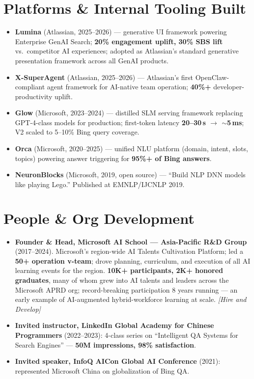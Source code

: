 \documentclass[10.5pt,letterpaper]{article}
\newcommand{\lp}[1]{\textcolor{blue!55!black}{\small\textit{[#1]}}}
\begin{document}
\section*{Platforms \& Internal Tooling Built}
\begin{itemize}
  \item \textbf{Lumina} (Atlassian, 2025--2026) --- generative UI framework powering Enterprise GenAI Search; \textbf{20\% engagement uplift, 30\% SBS lift} vs.\ competitor AI experiences; adopted as Atlassian's standard generative presentation framework across all GenAI products.
  \item \textbf{X-SuperAgent} (Atlassian, 2025--2026) --- Atlassian's first OpenClaw-compliant agent framework for AI-native team operation; \textbf{40\%+} developer-productivity uplift.
  \item \textbf{Glow} (Microsoft, 2023--2024) --- distilled SLM serving framework replacing GPT-4-class models for production; first-token latency \textbf{20--30\,s $\to$ $\sim$5\,ms}; V2 scaled to 5--10\% Bing query coverage.
  \item \textbf{Orca} (Microsoft, 2020--2025) --- unified NLU platform (domain, intent, slots, topics) powering answer triggering for \textbf{95\%+ of Bing answers}.
  \item \textbf{NeuronBlocks} (Microsoft, 2019, open source) --- ``Build NLP DNN models like playing Lego.'' Published at EMNLP/IJCNLP 2019.
\end{itemize}

\section*{People \& Org Development}
\begin{itemize}
  \item \textbf{Founder \& Head, Microsoft AI School --- Asia-Pacific R\&D Group} (2017--2024). Microsoft's region-wide AI Talents Cultivation Platform; led a \textbf{50+ operation v-team}; drove planning, curriculum, and execution of all AI learning events for the region. \textbf{10K+ participants, 2K+ honored graduates}, many of whom grew into AI talents and leaders across the Microsoft APRD org; record-breaking participation 8 years running --- an early example of AI-augmented hybrid-workforce learning at scale. \lp{Hire and Develop}
  \item \textbf{Invited instructor, LinkedIn Global Academy for Chinese Programmers} (2022--2023): 4-class series on ``Intelligent QA Systems for Search Engines'' --- \textbf{50M impressions, 98\% satisfaction}.
  \item \textbf{Invited speaker, InfoQ AICon Global AI Conference} (2021): represented Microsoft China on globalization of Bing QA.
\end{itemize}
\end{document}

